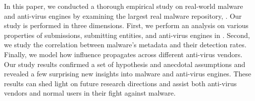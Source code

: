 In this paper, we conducted a thorough empirical study on real-world malware and anti-virus 
engines by examining the largest real malware repository, \vt. 
Our study is performed in three dimensions.
First, we perform an analysis on various properties of submissions, submitting entities, and anti-virus engines in \vt.
Second, we study the correlation between malware's metadata and their detection rates. 
Finally, we model how influence propagates across different anti-virus vendors. 
Our study results confirmed a set of hypothesis and anecdotal assumptions
and revealed a few surprising new insights into malware and anti-virus engines.
These results can shed light on future research directions
and assist both anti-virus vendors and normal users in their fight against malware.
